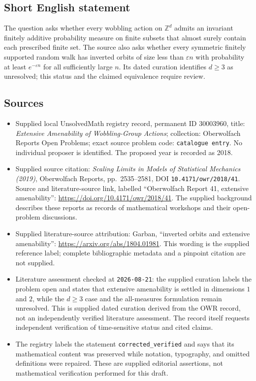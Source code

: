 \documentclass[11pt]{article}
\newcommand{\Z}{\mathbb{Z}}
\begin{document}
\subsection{Short English statement}
The question asks whether every wobbling action on \(\Z^d\) admits an invariant finitely additive probability measure on finite subsets that almost surely contain each prescribed finite set. The source also asks whether every symmetric finitely supported random walk has inverted orbits of size less than \(\varepsilon n\) with probability at least \(e^{-\varepsilon n}\) for all sufficiently large \(n\). Its dated curation identifies \(d\geq3\) as unresolved; this status and the claimed equivalence require review.
\subsection{Sources}
\begin{itemize}
\item Supplied local UnsolvedMath registry record, permanent ID \(30003960\), title: \emph{Extensive Amenability of Wobbling-Group Actions}; collection: Oberwolfach Reports Open Problems; exact source problem code: \texttt{catalogue entry}. No individual proposer is identified. The proposed year is recorded as 2018.
\item Supplied source citation: \emph{Scaling Limits in Models of Statistical Mechanics (2019)}, Oberwolfach Reports, pp.~2535--2581, DOI \texttt{10.4171/owr/2018/41}. Source and literature-source link, labelled ``Oberwolfach Report 41, extensive amenability'': \url{https://doi.org/10.4171/owr/2018/41}. The supplied background describes these reports as records of mathematical workshops and their open-problem discussions.
\item Supplied literature-source attribution: Garban, ``inverted orbits and extensive amenability'': \url{https://arxiv.org/abs/1804.01981}. This wording is the supplied reference label; complete bibliographic metadata and a pinpoint citation are not supplied.
\item Literature assessment checked at \texttt{2026-08-21}: the supplied curation labels the problem open and states that extensive amenability is settled in dimensions \(1\) and \(2\), while the \(d\geq3\) case and the all-measures formulation remain unresolved. This is supplied dated curation derived from the OWR record, not an independently verified literature assessment. The record itself requests independent verification of time-sensitive status and cited claims.
\item The registry labels the statement \texttt{corrected\_verified} and says that its mathematical content was preserved while notation, typography, and omitted definitions were repaired. These are supplied editorial assertions, not mathematical verification performed for this draft.
\end{itemize}
\end{document}
